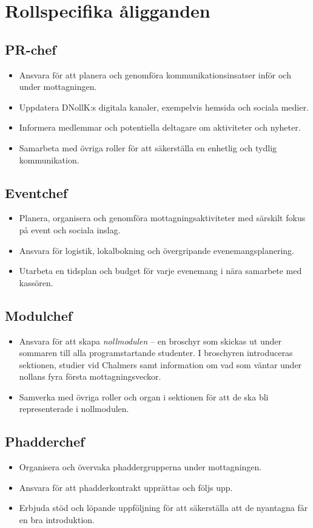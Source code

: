 \documentclass[a4paper]{dtekinstruktion}
\begin{document}
\section{Rollspecifika åligganden}
\subsection{PR-chef}
\begin{itemize}
  \item Ansvara för att planera och genomföra kommunikationsinsatser inför och under mottagningen.
  \item Uppdatera DNollK:s digitala kanaler, exempelvis hemsida och sociala medier.
  \item Informera medlemmar och potentiella deltagare om aktiviteter och nyheter.
  \item Samarbeta med övriga roller för att säkerställa en enhetlig och tydlig kommunikation.
\end{itemize}

\subsection{Eventchef}
\begin{itemize}
  \item Planera, organisera och genomföra mottagningsaktiviteter med särskilt fokus på event och sociala inslag.
  \item Ansvara för logistik, lokalbokning och övergripande evenemangsplanering.
  \item Utarbeta en tidsplan och budget för varje evenemang i nära samarbete med kassören.
\end{itemize}

\subsection{Modulchef}
\begin{itemize}
  \item Ansvara för att skapa \emph{nollmodulen} – en broschyr som skickas ut under sommaren till alla programstartande studenter. I broschyren introduceras sektionen, studier vid Chalmers samt information om vad som väntar under nollans fyra första mottagningsveckor.
  \item Samverka med övriga roller och organ i sektionen för att de ska bli representerade i nollmodulen.
\end{itemize}

\subsection{Phadderchef}
\begin{itemize}
  \item Organisera och övervaka phaddergrupperna under mottagningen.
  \item Ansvara för att phadderkontrakt upprättas och följs upp.
  \item Erbjuda stöd och löpande uppföljning för att säkerställa att de nyantagna får en bra introduktion.
\end{itemize}
\end{document}
